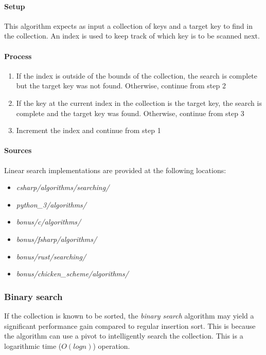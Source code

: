 \documentclass{article}
\begin{document}
{\paragraph{Setup}
This algorithm expects as input a collection of keys and a target key to find in the collection. An index is used to keep track
of which key is to be scanned next.

\paragraph{Process}
\begin{enumerate}
\item{If the index is outside of the bounds of the collection, the search is complete but the target key was not found.
  Otherwise, continue from step 2}
\item{If the key at the current index in the collection is the target key, the search is complete and the target key was found.
  Otherwise, continue from step 3}
\item{Increment the index and continue from step 1}
\end{enumerate}

\begin{samepage}
  \paragraph{Sources}
  Linear search implementations are provided at the following locations:
  \begin{itemize}
  \item{{\em csharp/algorithms/searching/}}
  \item{{\em python\_3/algorithms/}}
  \item{{\em bonus/c/algorithms/}}
  \item{{\em bonus/fsharp/algorithms/}}
  \item{{\em bonus/rust/searching/}}
  \item{{\em bonus/chicken\_scheme/algorithms/}}
  \end{itemize}
\end{samepage}

\subsubsection{Binary search}
If the collection is known to be sorted, the {\em binary search} algorithm may yield a significant performance
gain compared to regular insertion sort. This is because the algorithm can use a pivot to intelligently search
the collection. This is a logarithmic time (\(O(log n)\)) operation.

}
\end{document}
